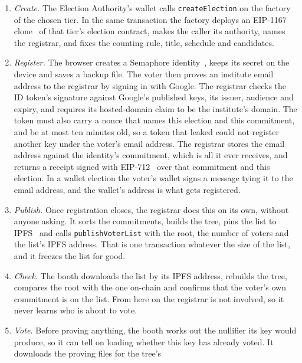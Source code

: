 \begin{enumerate}
  \item \emph{Create.} The Election Authority's wallet calls
        \texttt{createElection} on the factory of the chosen tier. In the same
        transaction the factory deploys an EIP-1167 clone~\cite{eip1167} of
        that tier's election contract, makes the caller its authority, names
        the registrar, and fixes the counting rule, title, schedule and
        candidates.
  \item \emph{Register.} The browser creates a Semaphore
        identity~\cite{semaphore}, keeps its secret on the device and saves a
        backup file. The voter then proves an institute email address to the
        registrar by signing in with Google. The registrar checks the ID token's
        signature against Google's published keys, its issuer, audience and
        expiry, and requires its hosted-domain claim to be the institute's
        domain. The token must also carry a nonce that names this election and
        this commitment, and be at most ten minutes old, so a token that leaked
        could not register another key under the voter's email address. The registrar stores the email address against the identity's
        commitment, which is all it ever receives, and returns a receipt
        signed with EIP-712~\cite{eip712} over that commitment and this
        election. In a wallet election the voter's wallet signs a message
        tying it to the email address, and the wallet's address is what gets
        registered.
  \item \emph{Publish.} Once registration closes, the registrar does this
        on its own, without anyone asking. It sorts the commitments, builds the
        tree, pins the list to IPFS~\cite{ipfs} and calls
        \texttt{publishVoterList} with the root, the number of voters and the
        list's IPFS address. That is one transaction whatever the size of the
        list, and it freezes the list for good.
  \item \emph{Check.} The booth downloads the list by its IPFS address,
        rebuilds the tree, compares the root with the one on-chain and confirms
        that the voter's own commitment is on the list. From here on the
        registrar is not involved, so it never learns who is about to vote.
  \item \emph{Vote.} Before proving anything, the booth works out the
        nullifier its key would produce, so it can tell on loading whether this
        key has already voted. It downloads the proving files for the tree's

\end{enumerate}

